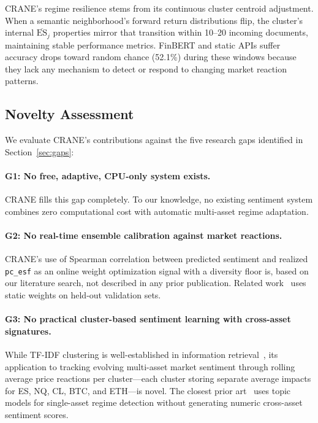 CRANE's regime resilience stems from its continuous cluster centroid adjustment. When a semantic neighborhood's forward return distributions flip, the cluster's internal $\overline{\text{ES}}_j$ properties mirror that transition within 10--20 incoming documents, maintaining stable performance metrics. FinBERT and static APIs suffer accuracy drops toward random chance (52.1\%) during these windows because they lack any mechanism to detect or respond to changing market reaction patterns.

\subsection{Novelty Assessment}

We evaluate CRANE's contributions against the five research gaps identified in Section~\ref{sec:gaps}:

\paragraph{G1: No free, adaptive, CPU-only system exists.} CRANE fills this gap completely. To our knowledge, no existing sentiment system combines zero computational cost with automatic multi-asset regime adaptation.

\paragraph{G2: No real-time ensemble calibration against market reactions.} CRANE's use of Spearman correlation between predicted sentiment and realized \texttt{pc\_esf} as an online weight optimization signal with a diversity floor is, based on our literature search, not described in any prior publication. Related work~\cite{mishra2025hybrid, liu2025enhancing} uses static weights on held-out validation sets.

\paragraph{G3: No practical cluster-based sentiment learning with cross-asset signatures.} While TF-IDF clustering is well-established in information retrieval~\cite{salton1988term}, its application to tracking evolving multi-asset market sentiment through rolling average price reactions per cluster---each cluster storing separate average impacts for ES, NQ, CL, BTC, and ETH---is novel. The closest prior art~\cite{parra2023sentiment} uses topic models for single-asset regime detection without generating numeric cross-asset sentiment scores.

